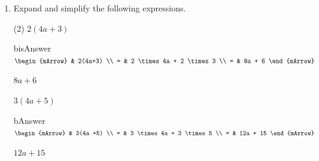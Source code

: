 \clearpage\noindent%
\begin{enumerate}[resume]	
  \item Expand and simplify the following expressions.
  \begin{subtask}(2)
    \task[]  $ 2(4a+3)   $
              \begin{envOut}[height=6cm]{bisAnswer}
			       $\begin{mArrow}
			                & 2(4a+3)        \\ 
			              = & 2 \times 4a + 2 \times 3        \\ 
                          = & 8a + 6   
	                \end{mArrow}$
              \end{envOut}			  
			  \begin{exercise}\begin{shortsolution}  
				       $8a + 6$
			  \end{shortsolution}\end{exercise}
			  
    \task[]  $ 3(4a +5)  $
              \begin{envOut}[height=6cm]{bAnswer}
			       $\begin{mArrow}
			                & 3(4a +5)       \\ 
			              = & 3 \times 4a + 3 \times 5      \\
			              = & 12a + 15
	                \end{mArrow}$
              \end{envOut}			  
			  \begin{exercise}\begin{shortsolution}  
				       $12a + 15$
			  \end{shortsolution}\end{exercise}			  
    \end{subtask}
\end{enumerate}
\clearpage\noindent%


